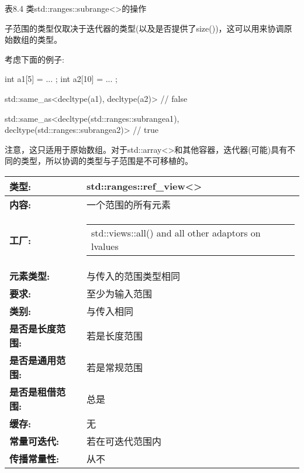 \begin{center}
表8.4 类std::ranges::subrange<>的操作
\end{center}


子范围的类型仅取决于迭代器的类型(以及是否提供了size())，这可以用来协调原始数组的类型。

考虑下面的例子:

\begin{cpp}
int a1[5] = { ... };
int a2[10] = { ... };

std::same_as<decltype(a1), decltype(a2)> // false

std::same_as<decltype(std::ranges::subrange{a1}),
			 decltype(std::ranges::subrange{a2})> // true
\end{cpp}

注意，这只适用于原始数组。对于std::array<>和其他容器，迭代器(可能)具有不同的类型，所以协调的类型与子范围是不可移植的。


\begin{longtable}[c]{|l|l|}
\hline
\textbf{类型:}                 & std::ranges::ref\_view\textless{}\textgreater{} \\ \hline
\endfirsthead
%
\endhead
%
\textbf{内容:}              & 一个范围的所有元素   \\ \hline
\textbf{工厂:}      & \begin{tabular}[c]{@{}l@{}}std::views::all() and all other adaptors on lvalues\end{tabular} \\ \hline
\textbf{元素类型:}         & 与传入的范围类型相同                 \\ \hline
\textbf{要求:}             & 至少为输入范围                     \\ \hline
\textbf{类别:}             & 与传入相同                                 \\ \hline
\textbf{是否是长度范围:} & 若是长度范围                                                \\ \hline
\textbf{是否是通用范围:}      & 若是常规范围                         \\ \hline
\textbf{是否是租借范围:}    & 总是                                         \\ \hline
\textbf{缓存:}               & 无                                        \\ \hline
\textbf{常量可迭代:}       & 若在可迭代范围内               \\ \hline
\textbf{传播常量性:} & 从不                                          \\ \hline
\end{longtable}


